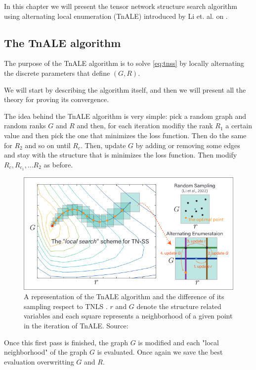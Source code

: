 \documentclass[11pt,a4paper,openright,oneside]{book}
\numberwithin{equation}{section}
\begin{document}
{In this chapter we will present the tensor network structure search algorithm using alternating local enumeration (TnALE)
introduced by Li et. al. on \cite{liAlternatingLocalEnumeration2023a}.

\subsection{The TnALE algorithm}

The purpose of the TnALE algorithm is to solve \ref{eq:tnss} by locally alternating the discrete parameters that define $(G, R)$.


We will start by describing the algorithm itself, and then we will present all the theory for proving its convergence.

The idea behind the TnALE algorithm is very simple: pick a random graph and random ranks $G$ and $R$ and then, for each iteration modifiy
the rank $R_1$ a certain value and then pick the one that minimizes the loss function. Then do the same
for $R_2$ and so on until $R_c$. Then, update $G$ by adding or removing some edges and stay with the structure that is minimizes the loss function.
Then modify $R_c, R_{c_1}, \dots R_2$ as before.

\begin{figure}[H]
    \centering
    \includegraphics[width=0.75\linewidth]{media/tnale-schema.png}
    \caption{A representation of the TnALE algorithm and the difference of its sampling respect to TNLS \cite{liPermutationSearchTensor2022}. $r$ and $G$
    denote the structure related variables and each square represents a neighborhood of a given point in the iteration of TnALE. Source: \cite{liAlternatingLocalEnumeration2023}}
\end{figure}

Once this first pass is finished, the graph $G$ is modified and each "local neighborhood" of the graph $G$ is evaluated.
Once again we save the best evaluation overwritting $G$ and $R$.

}
\end{document}
